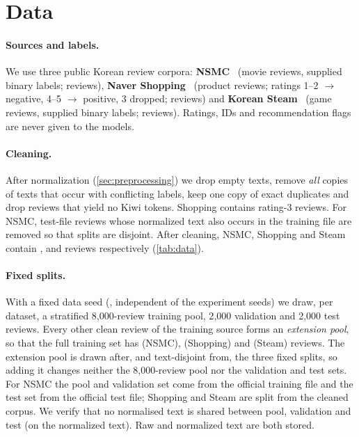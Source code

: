 \section{Data}
\label{sec:data}

\paragraph{Sources and labels.}
We use three public Korean review corpora:
\textbf{NSMC}~\cite{nsmc} (movie reviews, supplied binary labels; \nRawNSMC{} reviews),
\textbf{Naver Shopping}~\cite{bab2min_corpus} (product reviews; ratings 1--2 $\to$
negative, 4--5 $\to$ positive, 3 dropped; \nRawShopping{} reviews) and
\textbf{Korean Steam}~\cite{bab2min_corpus} (game reviews, supplied binary labels;
\nRawSteam{} reviews). Ratings, IDs and recommendation flags are never given to
the models.

\paragraph{Cleaning.}
After normalization (\cref{sec:preprocessing}) we drop empty texts, remove \emph{all}
copies of texts that occur with conflicting labels, keep one copy of exact duplicates and
drop reviews that yield no Kiwi tokens. Shopping contains \nRatingThreeShopping{}
rating-3 reviews. For NSMC, test-file reviews whose normalized text also occurs in the
training file are removed so that splits are disjoint.
After cleaning, NSMC, Shopping and Steam contain \nCleanNSMC{}, \nCleanShopping{}
and \nCleanSteam{} reviews respectively (\cref{tab:data}).

\paragraph{Fixed splits.}
With a fixed data seed (\dataSeed{}, independent of the experiment seeds) we draw,
per dataset, a stratified 8{,}000-review training pool, 2{,}000 validation and
2{,}000 test reviews. Every other clean review of the training source forms an
\emph{extension pool}, so that the full training set has \nFullNSMC{} (NSMC),
\nFullShopping{} (Shopping) and \nFullSteam{} (Steam) reviews. The extension pool is
drawn after, and text-disjoint from, the three fixed splits, so adding it changes neither
the 8{,}000-review pool nor the validation and test sets. For NSMC the pool and validation set come from the official
training file and the test set from the official test file; Shopping and Steam are
split from the cleaned corpus. We verify that no normalised text is shared between
pool, validation and test (on the normalized text). Raw and normalized text are both stored.

